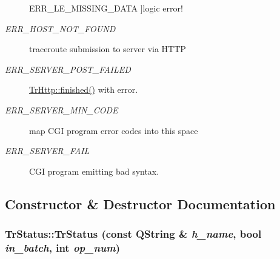 \begin{Desc}
\begin{description}
{{ERR\_\-LE\_\-MISSING\_\-DATA}
\label{classTrStatus_366057e7e0cc467a592518e5f0da53028c1c3321a69ca2c1b6dcf5be3b0e1a79}
}]logic error! \item[{\em 
\hypertarget{classTrStatus_366057e7e0cc467a592518e5f0da53026be2333c602f24072eec6688160f5e32}{
ERR\_\-HOST\_\-NOT\_\-FOUND}
\label{classTrStatus_366057e7e0cc467a592518e5f0da53026be2333c602f24072eec6688160f5e32}
}]traceroute submission to server via HTTP \item[{\em 
\hypertarget{classTrStatus_366057e7e0cc467a592518e5f0da5302d82874b4be3ee405df340a92f763161e}{
ERR\_\-SERVER\_\-POST\_\-FAILED}
\label{classTrStatus_366057e7e0cc467a592518e5f0da5302d82874b4be3ee405df340a92f763161e}
}]\hyperlink{classTrHttp_a1a518e5b0ba5501345888512a74199c}{TrHttp::finished()} with error. \item[{\em 
\hypertarget{classTrStatus_366057e7e0cc467a592518e5f0da5302d9e3f200861eaf809811bde85ee56520}{
ERR\_\-SERVER\_\-MIN\_\-CODE}
\label{classTrStatus_366057e7e0cc467a592518e5f0da5302d9e3f200861eaf809811bde85ee56520}
}]map CGI program error codes into this space \item[{\em 
\hypertarget{classTrStatus_366057e7e0cc467a592518e5f0da53025d0359a8465346dafc834a6a048508cc}{
ERR\_\-SERVER\_\-FAIL}
\label{classTrStatus_366057e7e0cc467a592518e5f0da53025d0359a8465346dafc834a6a048508cc}
}]CGI program emitting bad syntax. \end{description}
\end{Desc}



\subsection{Constructor \& Destructor Documentation}
\hypertarget{classTrStatus_6679e8c913fe04b4ae96359235119b12}{
\subsubsection[TrStatus]{\setlength{\rightskip}{0pt plus 5cm}TrStatus::TrStatus (const QString \& {\em h\_\-name}, \/  bool {\em in\_\-batch}, \/  int {\em op\_\-num})}}
\label{classTrStatus_6679e8c913fe04b4ae96359235119b12}


